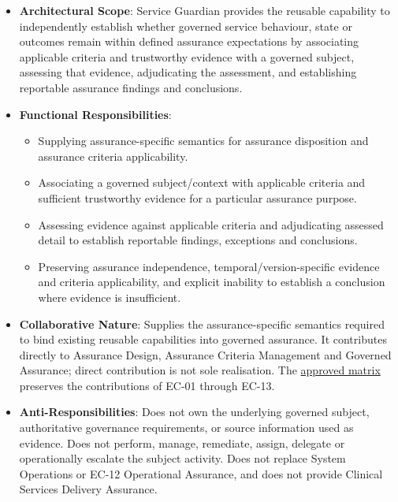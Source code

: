 \begin{itemize}

\item
\textbf{Architectural Scope}: Service Guardian provides the reusable capability to independently establish whether governed service behaviour, state or outcomes remain within defined assurance expectations by associating applicable criteria and trustworthy evidence with a governed subject, assessing that evidence, adjudicating the assessment, and establishing reportable assurance findings and conclusions.



\item
\textbf{Functional Responsibilities}:


\begin{itemize}

\item
Supplying assurance-specific semantics for assurance disposition and assurance criteria applicability.



\item
Associating a governed subject/\allowbreak{}context with applicable criteria and sufficient trustworthy evidence for a particular assurance purpose.



\item
Assessing evidence against applicable criteria and adjudicating assessed detail to establish reportable findings, exceptions and conclusions.



\item
Preserving assurance independence, temporal/\allowbreak{}version-specific evidence and criteria applicability, and explicit inability to establish a conclusion where evidence is insufficient.



\end{itemize}


\item
\textbf{Collaborative Nature}: Supplies the assurance-specific semantics required to bind existing reusable capabilities into governed assurance. It contributes directly to Assurance Design, Assurance Criteria Management and Governed Assurance; direct contribution is not sole realisation. The \hyperref[rad:assurance-strategy:54]{approved matrix} preserves the contributions of EC-01 through EC-13.



\item
\textbf{Anti-Responsibilities}: Does not own the underlying governed subject, authoritative governance requirements, or source information used as evidence. Does not perform, manage, remediate, assign, delegate or operationally escalate the subject activity. Does not replace System Operations or EC-12 Operational Assurance, and does not provide Clinical Services Delivery Assurance.




\end{itemize}
